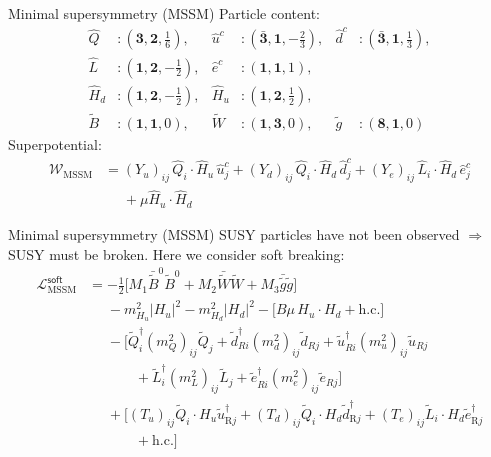 \documentclass[hyperref={pdfpagelabels=false},ngerman]{beamer}
\newcommand{\MSSM}{\ensuremath{\text{MSSM}}}
\begin{document}
\begin{frame}{Minimal supersymmetry (MSSM)}
  Particle content:
  \begin{equation*}
    \begin{aligned}
      \hat{Q}  &:\textstyle (\mathbf{     3} ,\mathbf{2}, \frac{1}{6}) ,
      &\hat{u}^c&:\textstyle (\bar{\mathbf{3}},\mathbf{1},-\frac{2}{3}) ,
      &\hat{d}^c&:\textstyle (\bar{\mathbf{3}},\mathbf{1}, \frac{1}{3}) ,
      \\
      \hat{L}  &:\textstyle (\mathbf{     1} ,\mathbf{2},-\frac{1}{2}) ,
      &\hat{e}^c&:\textstyle (\mathbf{     1} ,\mathbf{1}, 1          ) ,
      \\
      \hat{H}_d&:\textstyle (\mathbf{     1} ,\mathbf{2},-\frac{1}{2}) ,
      &\hat{H}_u&:\textstyle (\mathbf{     1} ,\mathbf{2}, \frac{1}{2}) ,
      \\
      \tilde{B}  &:\textstyle (\mathbf{1},\mathbf{1},0) ,
      &\tilde{W}  &:\textstyle (\mathbf{1},\mathbf{3},0) ,
      &\tilde{g}  &:\textstyle (\mathbf{8},\mathbf{1},0)
    \end{aligned}
  \end{equation*}
  Superpotential:
  \begin{align*}
    \mathcal{W}_\MSSM &= (Y_u)_{ij} \, \hat{Q}_i\cdot\hat{H}_u \, \hat{u}^c_j
    + (Y_d)_{ij} \, \hat{Q}_i\cdot\hat{H}_{d} \, \hat{d}^c_j
    +  (Y_e)_{ij} \, \hat{L}_i\cdot\hat{H}_{d} \, \hat{e}^c_j \\
    &\phantom{={}} + \mu \hat{H}_u\cdot\hat{H}_{d}
  \end{align*}
\end{frame}

\begin{frame}{Minimal supersymmetry (MSSM)}
  SUSY particles have not been observed $\Rightarrow$ SUSY must be
  broken.  Here we consider soft breaking:
  \begin{align*}
    \mathcal{L}_{\MSSM}^\mathsf{soft} &= -\frac12\Big[M_1\bar{\tilde{B}}^0\tilde{B}^0 +
    M_2\bar{\tilde{W}}\tilde{W} +
    M_3\bar{\tilde{g}}\tilde{g}\Big] \\
    &\phantom{={}} - m^2_{H_u}|H_u|^2 - m^2_{H_d}|H_d|^2 - \Big[B\mu \, {H}_u\cdot{H}_{d} +
    \text{h.c.}\Big] \\
    &\phantom{={}}
    -\Big[\tilde{Q}_i^\dagger(m^2_Q)_{ij}\tilde{Q}_j +
    \tilde{d}_{Ri}^\dagger(m^2_d)_{ij}\tilde{d}_{Rj}
    +
    \tilde{u}_{Ri}^\dagger(m^2_u)_{ij}\tilde{u}_{Rj} \\
    &\phantom{={}}\qquad
    + \tilde{L}_{i}^\dagger(m^2_L)_{ij}\tilde{L}_{j} +
    \tilde{e}_{Ri}^\dagger(m^2_e)_{ij}\tilde{e}_{Rj}
    \Big] \\
    &\phantom{={}}
    +\Big[(T_u)_{ij}\tilde{Q}_i \cdot  H_u\tilde{u}^\dagger_{\text{R}j}
    +
    (T_d)_{ij}\tilde{Q}_i \cdot H_{d} \tilde{d}^\dagger_{\text{R}j}
    + (T_e)_{ij}\tilde{L}_i \cdot H_{d}\tilde{e}^\dagger_{\text{R}j} \\
    &\phantom{={}} \qquad + \text{h.c.}\Big]
  \end{align*}
\end{frame}
\end{document}

